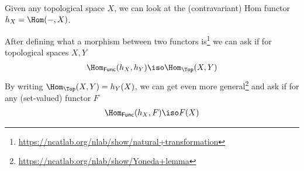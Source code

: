 \begin{itemize}
    Given any topological space $X$, we can look at the (contravariant) Hom functor $h_X = \Hom(-,X)$.

    After defining what a morphism between two functors is\footnote{\url{https://ncatlab.org/nlab/show/natural+transformation}}
    we can ask if for topological spaces $X,Y$
    \begin{align*}
      \Hom_{\textsf{Func}}(h_X,h_Y) \iso \Hom_{\Top}(X,Y)
    \end{align*}
    By writing $\Hom_{\Top}(X,Y) = h_Y(X)$, we can get even more general\footnote{\url{https://ncatlab.org/nlab/show/Yoneda+lemma}} and ask if for any (set-valued) functor $F$
    \begin{align*}
      \Hom_{\textsf{Func}}(h_X,F) \iso F(X)
    \end{align*}
\end{itemize}

